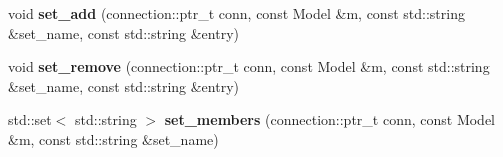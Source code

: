 \begin{DoxyCompactItemize}
\item 
\hypertarget{classredis3m_1_1patterns_1_1orm_a790d4963363d3f7af3a27f3c92261d6e}{void {\bfseries set\-\_\-add} (connection\-::ptr\-\_\-t conn, const Model \&m, const std\-::string \&set\-\_\-name, const std\-::string \&entry)}\label{classredis3m_1_1patterns_1_1orm_a790d4963363d3f7af3a27f3c92261d6e}

\item 
\hypertarget{classredis3m_1_1patterns_1_1orm_a5e552563226e067d04defdfb0ed77f57}{void {\bfseries set\-\_\-remove} (connection\-::ptr\-\_\-t conn, const Model \&m, const std\-::string \&set\-\_\-name, const std\-::string \&entry)}\label{classredis3m_1_1patterns_1_1orm_a5e552563226e067d04defdfb0ed77f57}

\item 
\hypertarget{classredis3m_1_1patterns_1_1orm_ab6fb72124e1ea7550eb0b908b95ab86f}{std\-::set$<$ std\-::string $>$ {\bfseries set\-\_\-members} (connection\-::ptr\-\_\-t conn, const Model \&m, const std\-::string \&set\-\_\-name)}\label{classredis3m_1_1patterns_1_1orm_ab6fb72124e1ea7550eb0b908b95ab86f}


\end{DoxyCompactItemize}
